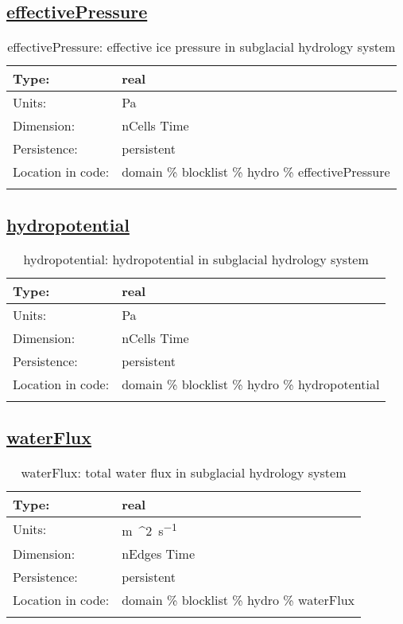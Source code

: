 \subsection[effectivePressure]{\hyperref[sec:var_tab_hydro]{effectivePressure}}
\label{subsec:var_sec_hydro_effectivePressure}
\begin{center}
\begin{longtable}{| p{2.0in} | p{4.0in} |}
        \hline 
        Type: & real \\
        \hline 
        Units: & \si{Pa} \\
        \hline 
        Dimension: & nCells Time \\
        \hline 
        Persistence: & persistent \\
        \hline 
         Location in code: & domain \% blocklist \% hydro \% effectivePressure \\
         \hline 
    \caption{effectivePressure: effective ice pressure in subglacial hydrology system}
\end{longtable}
\end{center}
\subsection[hydropotential]{\hyperref[sec:var_tab_hydro]{hydropotential}}
\label{subsec:var_sec_hydro_hydropotential}
\begin{center}
\begin{longtable}{| p{2.0in} | p{4.0in} |}
        \hline 
        Type: & real \\
        \hline 
        Units: & \si{Pa} \\
        \hline 
        Dimension: & nCells Time \\
        \hline 
        Persistence: & persistent \\
        \hline 
         Location in code: & domain \% blocklist \% hydro \% hydropotential \\
         \hline 
    \caption{hydropotential: hydropotential in subglacial hydrology system}
\end{longtable}
\end{center}
\subsection[waterFlux]{\hyperref[sec:var_tab_hydro]{waterFlux}}
\label{subsec:var_sec_hydro_waterFlux}
\begin{center}
\begin{longtable}{| p{2.0in} | p{4.0in} |}
        \hline 
        Type: & real \\
        \hline 
        Units: & \si{m{^2}.s^{-1}} \\
        \hline 
        Dimension: & nEdges Time \\
        \hline 
        Persistence: & persistent \\
        \hline 
         Location in code: & domain \% blocklist \% hydro \% waterFlux \\
         \hline 
    \caption{waterFlux: total water flux in subglacial hydrology system}
\end{longtable}
\end{center}
